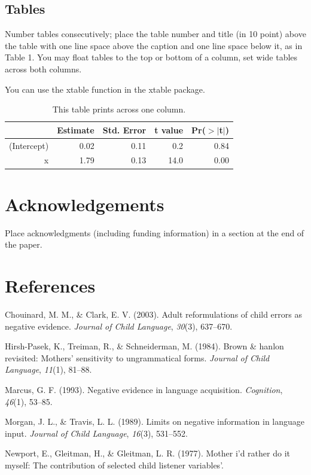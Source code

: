 \documentclass[10pt, letterpaper]{article}
\begin{document}
\hypertarget{tables}{%
\subsection{Tables}\label{tables}}

Number tables consecutively; place the table number and title (in 10
point) above the table with one line space above the caption and one
line space below it, as in Table 1. You may float tables to the top or
bottom of a column, set wide tables across both columns.

You can use the xtable function in the xtable package.

\begin{table}[H]
\centering
\begin{tabular}{rrrrr}
  \hline
 & Estimate & Std. Error & t value & Pr($>$$|$t$|$) \\ 
  \hline
(Intercept) & 0.02 & 0.11 & 0.2 & 0.84 \\ 
  x & 1.79 & 0.13 & 14.0 & 0.00 \\ 
   \hline
\end{tabular}
\caption{This table prints across one column.} 
\end{table}

\hypertarget{acknowledgements}{%
\section{Acknowledgements}\label{acknowledgements}}

Place acknowledgments (including funding information) in a section at
the end of the paper.

\hypertarget{references}{%
\section{References}\label{references}}

\setlength{\parindent}{-0.1in} 
\setlength{\leftskip}{0.125in}

\noindent

\hypertarget{refs}{}
\leavevmode\hypertarget{ref-chouinard2003}{}%
Chouinard, M. M., \& Clark, E. V. (2003). Adult reformulations of child
errors as negative evidence. \emph{Journal of Child Language},
\emph{30}(3), 637--670.

\leavevmode\hypertarget{ref-hirsh-pasek1984}{}%
Hirsh-Pasek, K., Treiman, R., \& Schneiderman, M. (1984). Brown \&
hanlon revisited: Mothers' sensitivity to ungrammatical forms.
\emph{Journal of Child Language}, \emph{11}(1), 81--88.

\leavevmode\hypertarget{ref-marcus1993}{}%
Marcus, G. F. (1993). Negative evidence in language acquisition.
\emph{Cognition}, \emph{46}(1), 53--85.

\leavevmode\hypertarget{ref-morgan1989}{}%
Morgan, J. L., \& Travis, L. L. (1989). Limits on negative information
in language input. \emph{Journal of Child Language}, \emph{16}(3),
531--552.

\leavevmode\hypertarget{ref-newport1977}{}%
Newport, E., Gleitman, H., \& Gleitman, L. R. (1977). Mother i'd rather
do it myself: The contribution of selected child listener variables'.


\end{document}
